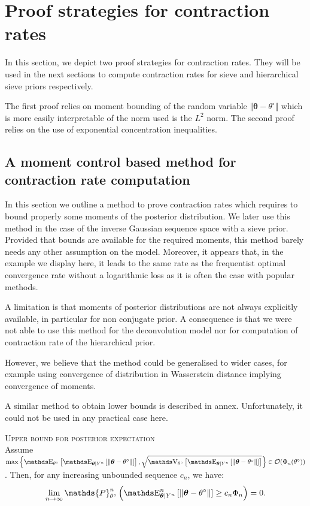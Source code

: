 \section{Proof strategies for contraction rates}\label{2.3}

In this section, we depict two proof strategies for contraction rates.
They will be used in the next sections to compute contraction rates for sieve and hierarchical sieve priors respectively.

The first proof relies on moment bounding of the random variable $\Vert \boldsymbol{\theta} - \theta^{\circ} \Vert$ which is more easily interpretable of the norm used is the $L^{2}$ norm.
The second proof relies on the use of exponential concentration inequalities.

\subsection{A moment control based method for contraction rate computation}\label{2.3.1}

In this section we outline a method to prove contraction rates which requires to bound properly some moments of the posterior distribution.
We later use this method in the case of the inverse Gaussian sequence space with a sieve prior.
Provided that bounds are available for the required moments, this method barely needs any other assumption on the model.
Moreover, it appears that, in the example we display here, it leads to the same rate as the frequentist optimal convergence rate without a logarithmic loss as it is often the case with popular methods.

A limitation is that moments of posterior distributions are not always explicitly available, in particular for non conjugate prior.
A consequence is that we were not able to use this method for the deconvolution model nor for computation of contraction rate of the hierarchical prior.

However, we believe that the method could be generalised to wider cases, for example using convergence of distribution in Wasserstein distance implying convergence of moments.

A similar method to obtain lower bounds is described in annex.
Unfortunately, it could not be used in any practical case here.

\bigskip

\begin{lm}\label{lm2.3}{\textsc{Upper bound for posterior expectation}\\}
Assume $\max\left\{ \E_{\theta^{\circ}}\left[\E_{\boldsymbol{\theta} \vert Y^{n}}\left[\Vert \boldsymbol{\theta} - \theta^{\circ} \Vert\right]\right], \sqrt{\V_{\theta^{\circ}}\left[ \E_{\boldsymbol{\theta} \vert Y^{n}}\left[\Vert \boldsymbol{\theta} - \theta^{\circ} \Vert\right]\right]} \right\} \in \mathcal{O}(\Phi_{n}(\theta^{\circ}))$.
Then, for any increasing unbounded sequence $c_{n}$, we have:
\[\lim\limits_{n \rightarrow \infty} \mathds{P}_{\theta^{\circ}}^{n}\left(\E_{\boldsymbol{\theta} \vert Y^{n}}^{n}\left[\Vert \boldsymbol{\theta} - \theta^{\circ} \Vert \right] \geq c_{n}\Phi_{n}\right) = 0.\]
\end{lm}

